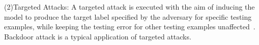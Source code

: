 (2)Targeted Attacks: A targeted attack is executed with
the aim of inducing the model to produce the target label
specified by the adversary for specific testing examples,
while keeping the testing error for other testing examples
unaffected~\cite{damaskinos2019aggregathor}. Backdoor attack is a typical application
of targeted attacks.  